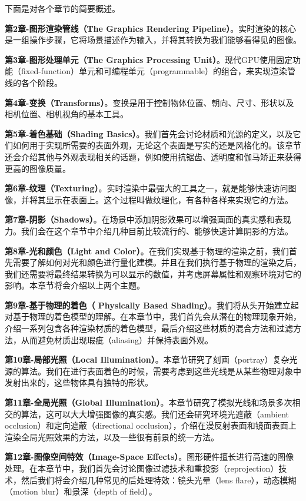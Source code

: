 \documentclass[
  paper=a4,
  ,captions=tableheading
]{scrartcl}
\begin{document}
下面是对各个章节的简要概述。

\textbf{第2章-图形渲染管线（The Graphics Rendering
Pipeline）}。实时渲染的核心是一组操作步骤，它将场景描述作为输入，并将其转换为我们能够看得见的图像。

\textbf{第3章-图形处理单元（The Graphics Processing
Unit）}。现代GPU使用固定功能（fixed-function）单元和可编程单元（programmable）的组合，来实现渲染管线的各个阶段。

\textbf{第4章-变换（Transforms）}。变换是用于控制物体位置、朝向、尺寸、形状以及相机位置、相机视角的基本工具。

\textbf{第5章-着色基础（Shading
Basics）}。我们首先会讨论材质和光源的定义，以及它们如何用于实现所需要的表面外观，无论这个表面是写实的还是风格化的。该章节还会介绍其他与外观表现相关的话题，例如使用抗锯齿、透明度和伽马矫正来获得更高的图像质量。

\textbf{第6章-纹理（Texturing）}。实时渲染中最强大的工具之一，就是能够快速访问图像，并将其显示在表面上。这个过程叫做纹理化，有各种各样来实现它的方法。

\textbf{第7章-阴影（Shadows）}。在场景中添加阴影效果可以增强画面的真实感和表现力。我们会在这个章节中介绍几种目前比较流行的、能够快速计算阴影的方法。

\textbf{第8章-光和颜色（Light and
Color）}。在我们实现基于物理的渲染之前，我们首先需要了解如何对光和颜色进行量化建模。并且在我们执行基于物理的渲染之后，我们还需要将最终结果转换为可以显示的数值，并考虑屏幕属性和观察环境对它的影响。本章节将会介绍以上两个主题。

\textbf{第9章-基于物理的着色（ Physically Based
Shading）}。我们将从头开始建立起对基于物理的着色模型的理解。在本章节中，我们首先会从潜在的物理现象开始，介绍一系列包含各种渲染材质的着色模型，最后介绍这些材质的混合方法和过滤方法，从而避免材质出现瑕疵（aliasing）并保持表面外观。

\textbf{第10章-局部光照（Local
Illumination）}。本章节研究了刻画（portray）复杂光源的算法。我们在进行表面着色的时候，需要考虑到这些光线是从某些物理对象中发射出来的，这些物体具有独特的形状。

\textbf{第11章-全局光照（Global
Illumination）}。本章节研究了模拟光线和场景多次相交的算法，这可以大大增强图像的真实感。我们还会研究环境光遮蔽（ambient
occlusion）和定向遮蔽（directional
occlusion），介绍在漫反射表面和镜面表面上渲染全局光照效果的方法，以及一些很有前景的统一方法。

\textbf{第12章-图像空间特效（Image-Space
Effects）}。图形硬件擅长进行高速的图像处理。在本章节中，我们首先会讨论图像过滤技术和重投影（reprojection）技术，然后我们将会介绍几种常见的后处理特效：镜头光晕（lens
flare），动态模糊（motion blur）和景深（depth of field）。
\end{document}
